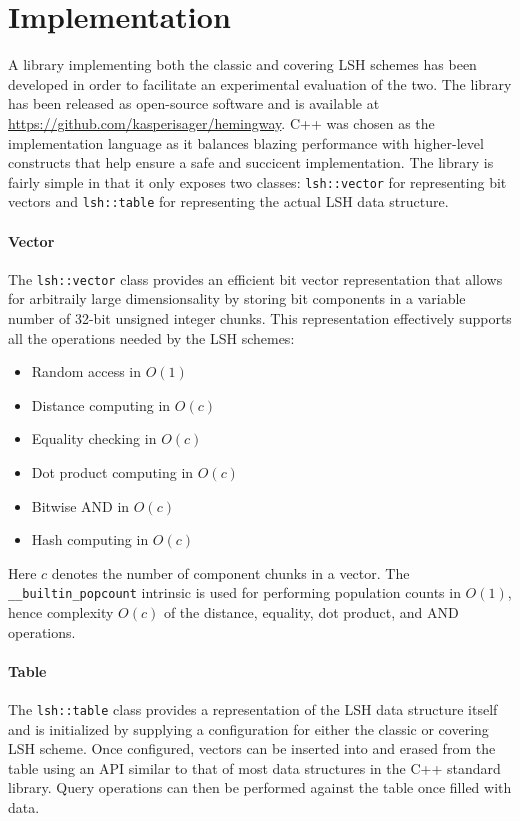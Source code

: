 \section{Implementation}
\label{implementation}

A library implementing both the classic and covering LSH schemes has been developed in order to facilitate an experimental evaluation of the two. The library has been released as open-source software and is available at \url{https://github.com/kasperisager/hemingway}. C++ was chosen as the implementation language as it balances blazing performance with higher-level constructs that help ensure a safe and succicent implementation. The library is fairly simple in that it only exposes two classes: \texttt{lsh::vector} for representing bit vectors and \texttt{lsh::table} for representing the actual LSH data structure.

\paragraph{Vector} The \texttt{lsh::vector} class provides an efficient bit vector representation that allows for arbitraily large dimensionsality by storing bit components in a variable number of 32-bit unsigned integer chunks. This representation effectively supports all the operations needed by the LSH schemes:

\begin{itemize}
  \item Random access in $O(1)$
  \item Distance computing in $O(c)$
  \item Equality checking in $O(c)$
  \item Dot product computing in $O(c)$
  \item Bitwise AND in $O(c)$
  \item Hash computing in $O(c)$
\end{itemize}

Here $c$ denotes the number of component chunks in a vector. The \texttt{\_\_builtin\_popcount} intrinsic is used for performing population counts in $O(1)$, hence complexity $O(c)$ of the distance, equality, dot product, and AND operations.

\paragraph{Table} The \texttt{lsh::table} class provides a representation of the LSH data structure itself and is initialized by supplying a configuration for either the classic or covering LSH scheme. Once configured, vectors can be inserted into and erased from the table using an API similar to that of most data structures in the C++ standard library. Query operations can then be performed against the table once filled with data.

